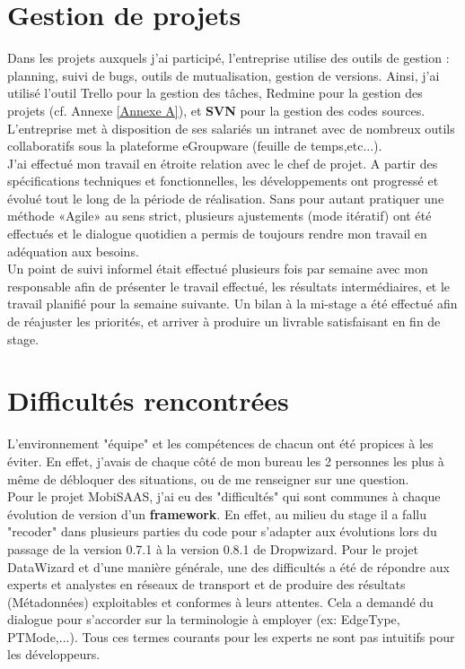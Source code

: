 \section{Gestion de projets}

Dans les projets auxquels j'ai participé, l'entreprise utilise des outils de gestion : planning, suivi de bugs, outils de mutualisation, gestion de versions. Ainsi, j'ai utilisé l'outil Trello pour la gestion des tâches, Redmine pour la gestion des projets (cf. Annexe \ref{Annexe A}), et \textbf{SVN} pour la gestion des codes sources. L'entreprise met à disposition de ses salariés un intranet avec de nombreux outils collaboratifs sous la plateforme eGroupware (feuille de temps,etc...).\\

J'ai effectué mon travail en étroite relation avec le chef de projet. A partir des spécifications techniques et fonctionnelles, les développements ont progressé et évolué tout le long de la période de réalisation. Sans pour autant pratiquer une méthode «Agile» au sens strict, plusieurs ajustements (mode itératif) ont été effectués et le dialogue quotidien a permis de toujours rendre mon travail en adéquation aux besoins. \\

Un point de suivi informel était effectué plusieurs fois par semaine avec mon responsable afin de présenter le travail effectué, les résultats intermédiaires, et le travail planifié pour la semaine suivante. Un bilan à la mi-stage a été effectué afin de réajuster les priorités, et arriver à produire un livrable satisfaisant en fin de stage. \\


\section{Difficultés rencontrées}

L'environnement "équipe" et les compétences de chacun ont été propices à les éviter. En effet, j'avais de chaque côté de mon bureau les 2 personnes les plus à même de débloquer des situations, ou de me renseigner sur une question. \\

Pour le projet MobiSAAS, j'ai eu des "difficultés" qui sont communes à chaque évolution de version d'un \textbf{framework}. En effet, au milieu du stage il a fallu "recoder" dans plusieurs parties du code pour s'adapter aux évolutions lors du passage de la version 0.7.1 à la version 0.8.1 de Dropwizard.
Pour le projet DataWizard et d'une manière générale, une des difficultés a été de répondre aux experts et analystes en réseaux de transport et de produire des résultats (Métadonnées) exploitables et conformes à leurs attentes. Cela a demandé du dialogue pour s'accorder sur la terminologie à employer (ex: EdgeType, PTMode,...). Tous ces termes courants pour les experts ne sont pas intuitifs pour les développeurs. \\
